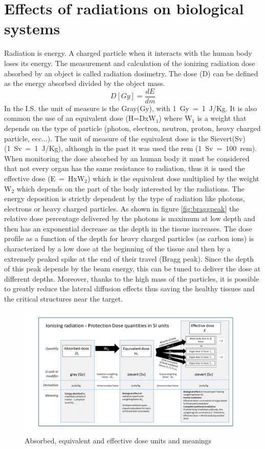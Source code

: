 \section{Effects of radiations on biological systems}
Radiation is energy. A charged particle when it interacts with the human body loses its energy. The measurement and calculation of the ionizing radiation dose absorbed by an object is called radiation dosimetry.
\newline
The dose (D) can be defined as the energy absorbed divided by the object mass.
\begin{equation}\label{eq:dose}
	D\left[Gy \right] =\frac{dE}{dm}
\end{equation}
In the I.S. the unit of measure is the Gray(Gy), with 1~Gy~=~1~J/Kg.
\newline
It is also common the use of an equivalent dose (H=DxW$_1$) where W$_1$ is a weight that depends on the type of particle (photon, electron, neutron, proton, heavy charged particle, ecc...). The unit of measure of the equivalent dose is the Sievert(Sv) (1~Sv~=~1~J/Kg), although in the past it was used the rem (1~Sv~=~100~rem).
\newline
When monitoring the dose absorbed by an human body it must be considered that not every organ has the same resistance to radiation, thus it is used the effective dose (E~=~HxW$_2$) which is the equivalent dose multiplied by the weight W$_2$ which depends on the part of the body interested by the radiations.
\newline
\noindent The energy deposition is strictly dependent by the type of radiation like photons, electrons or heavy charged particles. As shown in figure \ref{fig:braggpeak} the relative dose percentage delivered by the photons is maximum at low depth and then has an exponential decrease as the depth in the tissue increases.
The dose profile as a function of the depth for heavy charged particles (as carbon ions) is characterized by a low dose at the beginning of the tissue and then by a extremely peaked spike at the end of their travel (Bragg peak).
Since the depth of this peak depends by the beam energy, this can be tuned to deliver the dose at different depths.
Moreover, thanks to the high mass of the particles, it is possible to greatly reduce the lateral diffusion effects thus saving the healthy tissues and the critical structures near the target.
\begin{figure}[H]
	\centering
	\includegraphics[width=0.7\linewidth]{IMG/ch1/SIRadiationDoseUnits}
	\caption{Absorbed, equivalent and effective dose units and meanings}
	\label{fig:SIRadiationDoseUnits}
\end{figure} 
